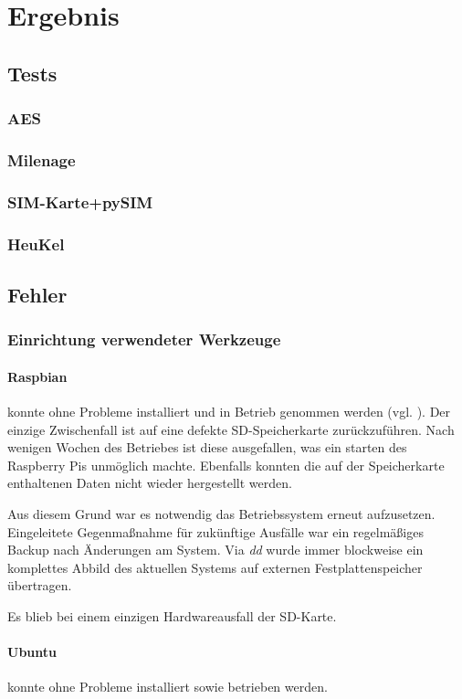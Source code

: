 \section{Ergebnis}
	\subsection{Tests}
		\subsubsection{AES}
		\subsubsection{Milenage}
		\subsubsection{SIM-Karte+pySIM}
		\subsubsection{HeuKel}
	\subsection{Fehler}
		\subsubsection{Einrichtung verwendeter Werkzeuge}
			\paragraph{Raspbian} konnte ohne Probleme installiert und in
			Betrieb genommen werden (vgl. ). Der einzige Zwischenfall ist auf eine
			defekte SD-Speicherkarte zurückzuführen. Nach wenigen Wochen
			des Betriebes ist diese ausgefallen, was ein starten des
			Raspberry Pis unmöglich machte. Ebenfalls konnten die auf der
			Speicherkarte enthaltenen Daten nicht wieder hergestellt werden.

			Aus diesem Grund war es notwendig das Betriebssystem erneut aufzusetzen.
			Eingeleitete Gegenmaßnahme für zukünftige Ausfälle war ein regelmäßiges Backup
			nach Änderungen am System. Via \textit{dd} wurde immer blockweise ein komplettes Abbild
			des aktuellen Systems auf externen Festplattenspeicher übertragen.

			Es blieb bei einem einzigen Hardwareausfall der SD-Karte.

			\paragraph{Ubuntu} konnte ohne Probleme installiert sowie betrieben werden.

